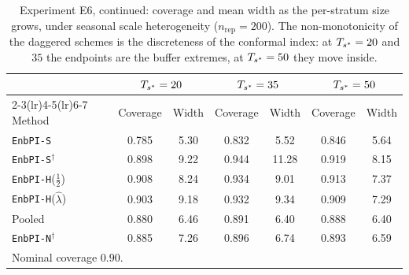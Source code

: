 \begin{table}[ht]
\centering
\small
\setlength{\tabcolsep}{4pt}
\caption{Experiment E6, continued: coverage and mean width as the
         per-stratum size grows, under seasonal scale
         heterogeneity ($n_{\mathrm{rep}} = 200$).  The
         non-monotonicity of the daggered schemes is the
         discreteness of the conformal index: at $T_{s^*} = 20$ and
         $35$ the endpoints are the buffer extremes, at $T_{s^*} = 50$
         they move inside.}
\label{tab:e6_ts}
\begin{tabular}{l cc cc cc}
\toprule
 & \multicolumn{2}{c}{$T_{s^*} = 20$} & \multicolumn{2}{c}{$T_{s^*} = 35$} & \multicolumn{2}{c}{$T_{s^*} = 50$} \\
\cmidrule(lr){2-3}\cmidrule(lr){4-5}\cmidrule(lr){6-7}
Method & Coverage & Width & Coverage & Width & Coverage & Width \\
\midrule
\texttt{EnbPI-S} & 0.785 & 5.30 & 0.832 & 5.52 & 0.846 & 5.64 \\
\texttt{EnbPI-S}$^\dagger$ & 0.898 & 9.22 & 0.944 & 11.28 & 0.919 & 8.15 \\
\texttt{EnbPI-H}($\tfrac12$) & 0.908 & 8.24 & 0.934 & 9.01 & 0.913 & 7.37 \\
\texttt{EnbPI-H}($\hat\lambda$) & 0.903 & 9.18 & 0.932 & 9.34 & 0.909 & 7.29 \\
Pooled & 0.880 & 6.46 & 0.891 & 6.40 & 0.888 & 6.40 \\
\texttt{EnbPI-N}$^\dagger$ & 0.885 & 7.26 & 0.896 & 6.74 & 0.893 & 6.59 \\
\bottomrule
\multicolumn{7}{l}{\footnotesize Nominal coverage $0.90$.}\\
\end{tabular}
\end{table}
